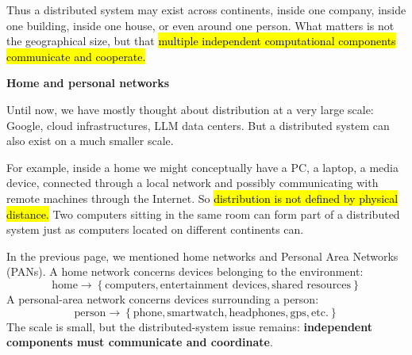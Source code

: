\highspace
Thus a distributed system may exist across continents, inside one company, inside one building, inside one house, or even around one person. What matters is not the geographical size, but that \hl{multiple independent computational components communicate and cooperate.}

\newpage

\begin{flushleft}
    \textcolor{Green3}{ \textbf{Home and personal networks}}
\end{flushleft}
Until now, we have mostly thought about distribution at a very large scale: Google, cloud infrastructures, LLM data centers. But a distributed system can also exist on a much smaller scale.

\highspace
For example, inside a home we might conceptually have a PC, a laptop, a media device, connected through a local network and possibly communicating with remote machines through the Internet. So \hl{distribution is not defined by physical distance.} Two computers sitting in the same room can form part of a distributed system just as computers located on different continents can.

\highspace
In the previous page, we mentioned home networks and Personal Area Networks (PANs). A home network concerns devices belonging to the environment:
\begin{equation*}
    \text{home} \to \left\{
        \text{computers},
        \text{entertainment devices},
        \text{shared resources}
    \right\}
\end{equation*}
A personal-area network concerns devices surrounding a person:
\begin{equation*}
    \text{person} \to \left\{
        \text{phone},
        \text{smartwatch},
        \text{headphones},
        \text{gps},
        \text{etc.}
    \right\}
\end{equation*}
\textcolor{Red2}{} The scale is small, but the distributed-system issue remains: \textbf{independent components must communicate and coordinate}.

